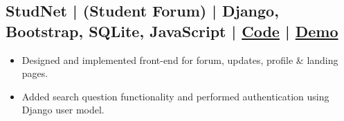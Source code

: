 \documentclass[a4,10pt]{article}
\newenvironment{zitemize}{
\begin{itemize}\itemsep0pt \parskip0pt \parsep1pt}
{\end{itemize}\vspace{-0.5cm}}
\begin{document}

\vspace{0.1cm}
\subsection*{StudNet {\normalsize\normalfont | (Student Forum) | Django, Bootstrap, SQLite, JavaScript} |  {\href{https://github.com/DevelopersLeague/StudNet}{Code} }|  {\href{https://stud-net.herokuapp.com/}{Demo} }} 
    \begin{zitemize}
        \item Designed and implemented front-end for forum, updates, profile \& landing pages.
        \item Added search question functionality and performed authentication using Django user model.
    \end{zitemize}

\vspace{0.1cm}

        




\end{document}

